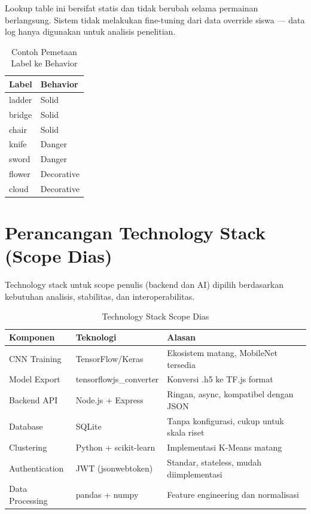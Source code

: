 Lookup table ini bersifat statis dan tidak berubah selama permainan berlangsung. Sistem tidak melakukan fine-tuning dari data override siswa --- data log hanya digunakan untuk analisis penelitian.

\begin{table}[ht]
\centering
\caption{Contoh Pemetaan Label ke Behavior}
\label{tab:behavior-mapping}
\begin{tabular}{|l|l|}
\hline
\textbf{Label} & \textbf{Behavior} \\ \hline
ladder & Solid \\ \hline
bridge & Solid \\ \hline
chair & Solid \\ \hline
knife & Danger \\ \hline
sword & Danger \\ \hline
flower & Decorative \\ \hline
cloud & Decorative \\ \hline
\end{tabular}
\end{table}


\section{Perancangan Technology Stack (Scope Dias)}

Technology stack untuk scope penulis (backend dan AI) dipilih berdasarkan kebutuhan analisis, stabilitas, dan interoperabilitas.

\begin{table}[ht]
\centering
\caption{Technology Stack Scope Dias}
\label{tab:tech-stack-dias}
\begin{tabular}{|l|l|l|}
\hline
\textbf{Komponen} & \textbf{Teknologi} & \textbf{Alasan} \\ \hline
CNN Training & TensorFlow/Keras & Ekosistem matang, MobileNet tersedia \\ \hline
Model Export & tensorflowjs\_converter & Konversi .h5 ke TF.js format \\ \hline
Backend API & Node.js + Express & Ringan, async, kompatibel dengan JSON \\ \hline
Database & SQLite & Tanpa konfigurasi, cukup untuk skala riset \\ \hline
Clustering & Python + scikit-learn & Implementasi K-Means matang \\ \hline
Authentication & JWT (jsonwebtoken) & Standar, stateless, mudah diimplementasi \\ \hline
Data Processing & pandas + numpy & Feature engineering dan normalisasi \\ \hline
\end{tabular}
\end{table}

